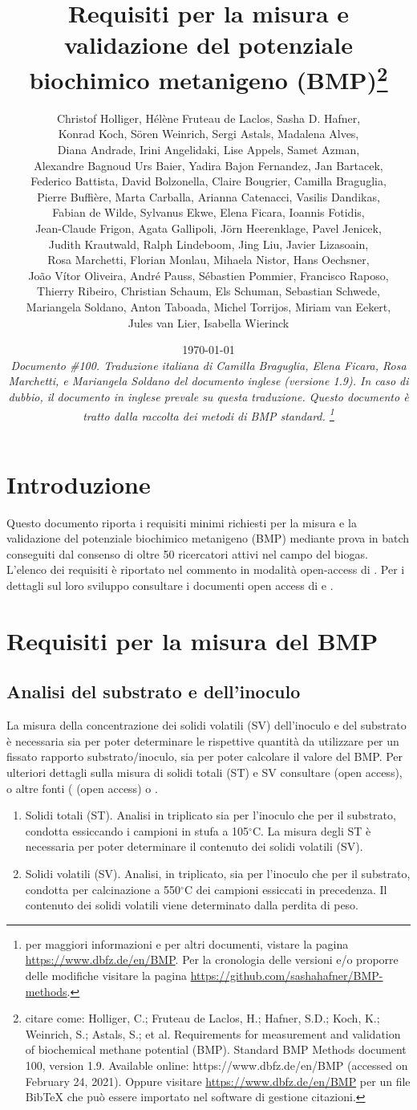\documentclass[]{article}
\title {Requisiti per la misura e validazione del potenziale biochimico metanigeno (BMP)\footnote{
  citare come: 
Holliger, C.; Fruteau de Laclos, H.; Hafner, S.D.; Koch, K.; Weinrich, S.; Astals, S.; et al. Requirements for measurement and validation of biochemical methane potential (BMP). Standard BMP Methods document 100, version 1.9. Available online: https://www.dbfz.de/en/BMP (accessed on February 24, 2021).
\newline
  Oppure visitare \url{https://www.dbfz.de/en/BMP} per un file BibTeX che può essere importato nel software di gestione citazioni.
}}
\author{
Christof Holliger, 
H{\'e}l{\`e}ne Fruteau de Laclos,
Sasha D. Hafner,\\
Konrad Koch,
S{\"o}ren Weinrich,
Sergi Astals, 
Madalena Alves, \\ 
Diana Andrade,
Irini Angelidaki,
Lise Appels, 
Samet Azman, \\
Alexandre Bagnoud
Urs Baier,
Yadira Bajon Fernandez,
Jan Bartacek,\\
Federico Battista,
David Bolzonella,
Claire Bougrier,
Camilla Braguglia, \\
Pierre Buffi{\`e}re,
Marta Carballa,
Arianna Catenacci,
Vasilis Dandikas, \\
Fabian de Wilde,
Sylvanus Ekwe,
Elena Ficara,
Ioannis Fotidis,\\
Jean-Claude Frigon,
Agata Gallipoli,
J{\"o}rn Heerenklage,
Pavel Jenicek,\\
Judith Krautwald,
Ralph Lindeboom,
Jing Liu,
Javier Lizasoain, \\
Rosa Marchetti,
Florian Monlau,
Mihaela Nistor,
Hans Oechsner,\\
Jo{\~a}o V{\'i}tor Oliveira,
Andr{\'e} Pauss,
S{\'e}bastien Pommier,
Francisco Raposo, \\
Thierry Ribeiro,
Christian Schaum,
Els Schuman,
Sebastian Schwede, \\
Mariangela Soldano,
Anton Taboada,
Michel Torrijos,
Miriam van Eekert,\\
Jules van Lier, 
Isabella Wierinck
}
\date{\today \\
\bigskip
\textit{
  Documento \#100.
  Traduzione italiana di Camilla Braguglia, Elena Ficara, Rosa Marchetti, e Mariangela Soldano del documento inglese (versione 1.9). In caso di dubbio, il documento in inglese prevale su questa traduzione.  
  Questo documento è tratto dalla raccolta dei metodi di BMP standard.
    \footnote{per maggiori informazioni e per altri documenti, vistare la pagina \url{https://www.dbfz.de/en/BMP}. 
    Per la cronologia delle versioni e/o proporre delle modifiche visitare la pagina \url{https://github.com/sashahafner/BMP-methods}.}
}
}
\begin{document}
\maketitle

\section{Introduzione}
Questo documento riporta i requisiti minimi richiesti per la misura e la validazione del potenziale biochimico metanigeno (BMP) mediante prova in batch conseguiti dal consenso di oltre 50 ricercatori attivi nel campo del biogas.
L'elenco dei requisiti è riportato nel commento in modalità open-access di \citet{holligerStandardizationBiomethanePotential2021}.
Per i dettagli sul loro sviluppo consultare i documenti open access di \citet{holligerStandardizationBiomethanePotential2016} e \citet{hafnerImprovingInterlaboratoryReproducibility2020}. 

\section{Requisiti per la misura del BMP}
\label{sec:requirements}
\subsection{Analisi del substrato e dell’inoculo}
\label{sec:analysis}
La misura della concentrazione dei solidi volatili (SV) dell’inoculo e del substrato è necessaria sia per poter determinare le rispettive quantità da utilizzare per un fissato rapporto substrato/inoculo, sia per poter calcolare il valore del BMP.
Per ulteriori dettagli sulla misura di solidi totali (ST) e SV consultare \citet{epaMethod1684Total2001} (open access), o altre fonti (\citet{strachDeterminationTotalSolids2020} (open access) o \citet{bairdStandardMethodsExamination2017}. 
  \begin{enumerate}
    \item Solidi totali (ST). Analisi in triplicato sia per l’inoculo che per il substrato, condotta essiccando i campioni in stufa a 105$^\circ$C. La misura degli ST è necessaria per poter determinare il contenuto dei solidi volatili (SV).
    \item Solidi volatili (SV). Analisi, in triplicato, sia per l’inoculo che per il substrato, condotta per calcinazione a 550$^\circ$C dei campioni essiccati in precedenza. Il contenuto dei solidi volatili viene determinato dalla perdita di peso.

  \end{enumerate}
\end{document}
